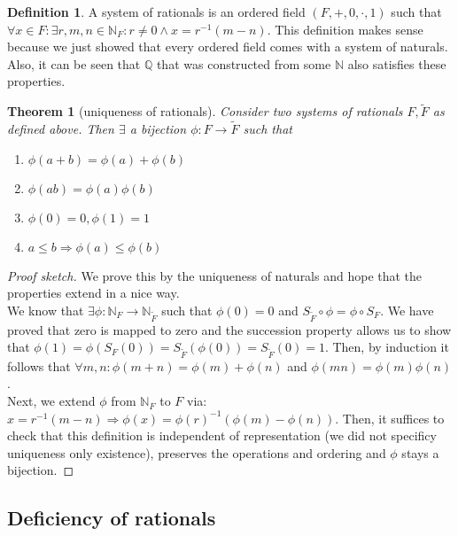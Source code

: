 \documentclass{article}
\newcommand\N{\ensuremath{\mathbb{N}}}
\newcommand\Q{\ensuremath{\mathbb{Q}}}
\newtheorem{theorem}{Theorem}[section]
\theoremstyle{definition}
\newtheorem{definition}{Definition}[subsection]
\theoremstyle{remark}
\theoremstyle{plain}
\begin{document}
\begin{definition}
    A system of rationals is an ordered field \((F,+,0,\cdot,1)\) such that \(\forall x \in F: 
    \exists r,m,n \in \N_{F}: r\neq 0 \land x = r^{-1}(m-n)\). This definition makes sense because
    we just showed that every ordered field comes with a system of naturals. Also, it can be seen that \(\Q\)
    that was constructed from some \(\N\) also satisfies these properties.
\end{definition}

\begin{theorem}[uniqueness of rationals]
    Consider two systems of rationals \(F, \tilde{F}\) as defined above. Then \(\exists\) a bijection
    \(\phi: F \to \tilde{F}\) such that 
    \begin{enumerate}
        \item \(\phi(a+b) = \phi(a) + \phi(b)\)
        \item \(\phi(ab) = \phi(a)\phi(b)\)
        \item \(\phi(0)=0, \phi(1) = 1\)
        \item \(a \leq b \Rightarrow \phi(a) \leq \phi(b)\)
    \end{enumerate}
\end{theorem}
\begin{proof}[Proof sketch]
    We prove this by the uniqueness of naturals and hope that the properties extend in a nice way. \\
    We know that \(\exists \phi: \N_F \to \N_{\tilde{F}}\) such that \(\phi(0) = 0\) and \(S_{\tilde{F}}\circ \phi = \phi \circ S_F\). 
    We have proved that zero is mapped to zero and the succession property allows us to show that \(\phi(1) = \phi(S_F(0)) = S_{\tilde{F}}
    (\phi(0)) = S_{\tilde{F}}(0) = 1\). Then, by induction it follows that \(\forall m,n: \phi(m+n) = \phi(m)+\phi(n)\) and \(\phi(mn) = \phi(m)\phi(n)\).\\
    Next, we extend \(\phi\) from \(\N_{F}\) to \(F\) via: \(x = r^{-1}(m-n) \Rightarrow \phi(x) = \phi(r)^{-1}(\phi(m)-\phi(n))\). Then, it suffices to check that
    this definition is independent of representation (we did not specificy uniqueness only existence), preserves the operations and ordering and \(\phi\) stays a bijection.
\end{proof}

\subsection{Deficiency of rationals}
\end{document}
